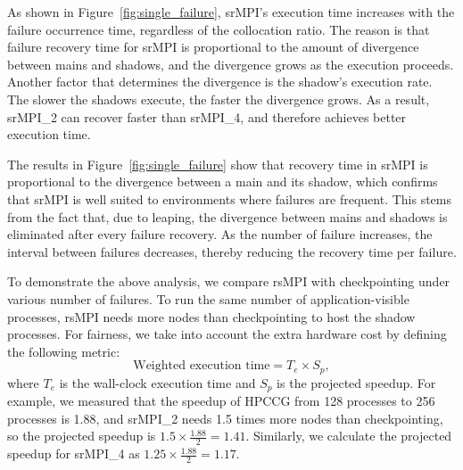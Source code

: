 As shown in Figure~\ref{fig:single_failure}, srMPI's execution time increases with the failure occurrence time, regardless of the collocation ratio. The reason is that failure recovery time for srMPI is proportional to the amount of divergence between mains and shadows, and the divergence grows as the execution proceeds. 
Another factor that determines the divergence is the shadow's execution rate. The slower the shadows execute, the faster the divergence grows. As a result, srMPI\_2 can recover faster than srMPI\_4, and therefore achieves better execution time.


The results in Figure~\ref{fig:single_failure} show that recovery time in srMPI is proportional to the divergence between a main and its shadow,  which confirms that srMPI is well suited to environments where failures are frequent. 
This stems from the fact that, due to leaping, the divergence between mains and shadows is eliminated after every failure recovery. As the number of failure increases, the interval between failures decreases, thereby reducing the recovery time per failure.

To demonstrate the above analysis, we compare rsMPI with checkpointing under various number of failures. To run the same number of application-visible processes, rsMPI needs more nodes than checkpointing to host the shadow processes. For fairness, we take into account the extra hardware cost by defining the following metric:
$$\text{Weighted execution time} = T_e \times S_p,$$ where $T_e$ is the wall-clock execution time and $S_p$ is the projected speedup. For example, we measured that the speedup of HPCCG from 128 processes to 256 processes is 1.88, and srMPI\_2 needs 1.5 times more nodes than checkpointing, so the projected speedup is $1.5\times\frac{1.88}{2}=1.41$. Similarly, we calculate the projected speedup for srMPI\_4 as $1.25\times\frac{1.88}{2}=1.17$.

